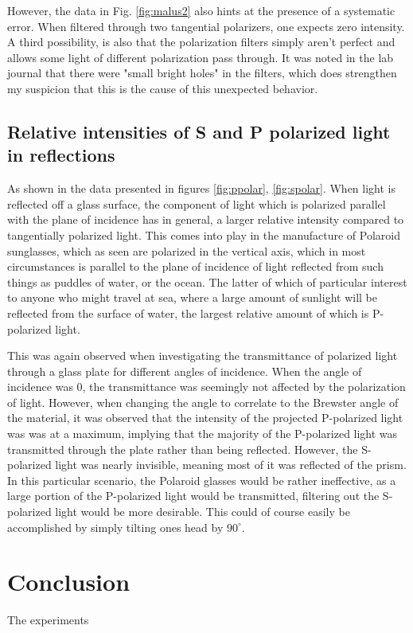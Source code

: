 \documentclass[11pt,a4paper, twocolumn]{article}
\begin{document}
    However, the data in Fig. \ref{fig:malus2} also hints at the presence of a systematic error. When filtered through two tangential polarizers, one expects zero intensity. A third possibility, is also that the polarization filters simply aren't perfect and allows some light of different polarization pass through. It was noted in the lab journal that there were "small bright holes" in the filters, which does strengthen my suspicion that this is the cause of this unexpected behavior.

  \subsection{Relative intensities of S and P polarized light in reflections}
    As shown in the data presented in figures \ref{fig:ppolar}, \ref{fig:spolar}. When light is reflected off a glass surface, the component of light which is polarized parallel with the plane of incidence has in general, a larger relative intensity compared to tangentially polarized light. This comes into play in the manufacture of Polaroid sunglasses, which as seen are polarized in the vertical axis, which in most circumstances is parallel to the plane of incidence of light reflected from such things as puddles of water, or the ocean. The latter of which of particular interest to anyone who might travel at sea, where a large amount of sunlight will be reflected from the surface of water, the largest relative amount of which is P-polarized light.

    This was again observed when investigating the transmittance of polarized light through a glass plate for different angles of incidence. When the angle of incidence was 0, the transmittance was seemingly not affected by the polarization of light. However, when changing the angle to correlate to the Brewster angle of the material, it was observed that the intensity of the projected P-polarized light was was at a maximum, implying that the majority of the P-polarized light was transmitted through the plate rather than being reflected. However, the S-polarized light was nearly invisible, meaning most of it was reflected of the prism. In this particular scenario, the Polaroid glasses would be rather ineffective, as a large portion of the P-polarized light would be transmitted, filtering out the S-polarized light would be more desirable. This could of course easily be accomplished by simply tilting ones head by $90^\circ$.


\section{\label{sect:conclusion}Conclusion}
  The experiments 
\onecolumn




\end{document}
